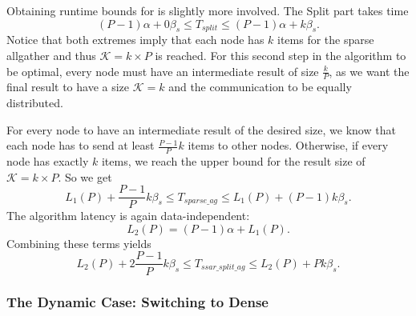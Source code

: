 \documentclass[11pt]{article}
\begin{document}
%		
%		
%		
%		
%		

\noindent Obtaining runtime bounds for \ssartwo{} is slightly more involved. The Split part takes time $$(P-1)\alpha + 0\beta_s \leq T_{split} \leq (P-1)\alpha + k\beta_s.$$ 
Notice that both extremes imply that each node has $k$ items for the sparse allgather and thus $\mathcal{K} = k \times P$ is reached. For this second step in the algorithm to be optimal, every node must have an intermediate result of size $\frac{k}{P}$, as we want the final result to have a size $\mathcal{K} = k$ and the communication to be equally distributed. 

For every node to have an intermediate result of the desired size, we know that each node has to send at least $\frac{P-1}{P}k$ items to other nodes. Otherwise, if every node has exactly $k$ items, we reach the upper bound for the result size of $\mathcal{K} = k \times P$. So we get $$L_1(P) + \frac{P-1}{P}k\beta_s \leq T_{sparse\_ag} \leq L_1(P) + (P-1)k\beta_s.$$
The algorithm latency is again data-independent: $$L_2(P) = (P-1)\alpha + L_1(P).$$
Combining these terms yields 
$$L_2(P) + 2\frac{P-1}{P}k\beta_s \leq T_{ssar\_split\_ag} \leq L_2(P) + Pk\beta_s.$$

\subsubsection{The Dynamic Case: Switching to Dense} 
\end{document}
